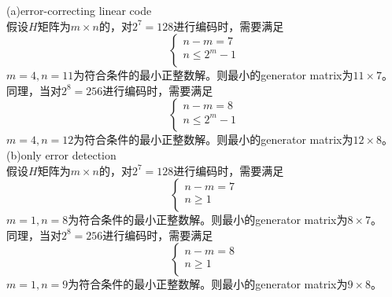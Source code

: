 \documentclass[a4paper, justified]{tufte-handout}
\begin{document}
\begin{solution}
  (a)error-correcting linear code\\
  假设$H$矩阵为$m\times n$的，对$2^7=128$进行编码时，需要满足
  $$ \left\{
    \begin{aligned}
      n-m =  7        \\
      n \leq 2^ m - 1 \\
    \end{aligned}
    \right.
  $$
  $m=4,n=11$为符合条件的最小正整数解。则最小的generator matrix为$11\times 7$。\\
  同理，当对$2^8=256$进行编码时，需要满足
  $$ \left\{
    \begin{aligned}
      n-m =  8        \\
      n \leq 2^ m - 1 \\
    \end{aligned}
    \right.
  $$
  $m=4,n=12$为符合条件的最小正整数解。则最小的generator matrix为$12\times 8$。\\

  \noindent(b)only error detection\\
  假设$H$矩阵为$m\times n$的，对$2^7=128$进行编码时，需要满足
  $$ \left\{
    \begin{aligned}
      n-m =  7 \\
      n \geq 1 \\
    \end{aligned}
    \right.
  $$
  $m=1,n=8$为符合条件的最小正整数解。则最小的generator matrix为$8\times 7$。\\
  同理，当对$2^8=256$进行编码时，需要满足
  $$ \left\{
    \begin{aligned}
      n-m =  8 \\
      n \geq 1 \\
    \end{aligned}
    \right.
  $$
  $m=1,n=9$为符合条件的最小正整数解。则最小的generator matrix为$9\times 8$。\\
\end{solution}

\begin{problem}[TJ 8-22]
\end{problem}
\end{document}
